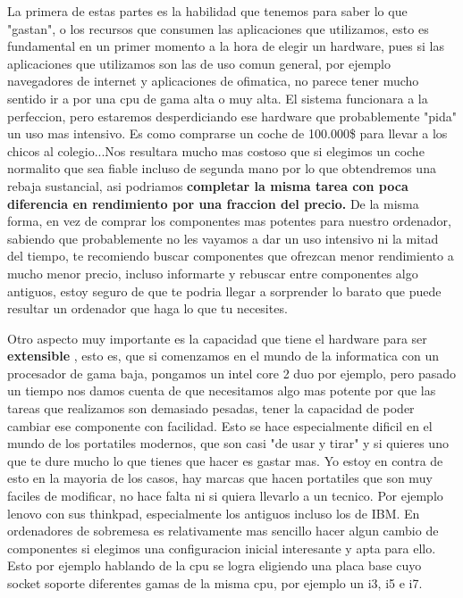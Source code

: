 La primera de estas partes es la habilidad que tenemos para saber lo que "gastan", o los recursos que consumen las aplicaciones que utilizamos, esto es fundamental en un primer momento a la hora de elegir un hardware, pues si las aplicaciones que utilizamos son las de uso comun general, por ejemplo navegadores de internet y aplicaciones de ofimatica, no parece tener mucho sentido ir a por una cpu de gama alta o muy alta. El sistema funcionara a la perfeccion, pero estaremos desperdiciando ese hardware que probablemente "pida" un uso mas intensivo. Es como comprarse un coche de 100.000\$ para llevar a los chicos al colegio...Nos resultara mucho mas costoso que si elegimos un coche normalito que sea fiable incluso de segunda mano por lo que obtendremos una rebaja sustancial, asi podriamos \textbf{ completar la misma tarea con poca diferencia en rendimiento por una fraccion del precio. } De la misma forma, en vez de comprar los componentes mas potentes para nuestro ordenador, sabiendo que probablemente no les vayamos a dar un uso intensivo ni la mitad del tiempo, te recomiendo buscar componentes que ofrezcan menor rendimiento a mucho menor precio, incluso informarte y rebuscar entre componentes algo antiguos, estoy seguro de que te podria llegar a sorprender lo barato que puede resultar un ordenador que haga lo que tu necesites.

Otro aspecto muy importante es la capacidad que tiene el hardware para ser \textbf{ extensible }, esto es, que si comenzamos en el mundo de la informatica con un procesador de gama baja, pongamos un intel core 2 duo por ejemplo, pero pasado un tiempo nos damos cuenta de que necesitamos algo mas potente por que las tareas que realizamos son demasiado pesadas, tener la capacidad de poder cambiar ese componente con facilidad. Esto se hace especialmente dificil en el mundo de los portatiles modernos, que son casi "de usar y tirar" y si quieres uno que te dure mucho lo que tienes que hacer es gastar mas. Yo estoy en contra de esto en la mayoria de los casos, hay marcas que hacen portatiles que son muy faciles de modificar, no hace falta ni si quiera llevarlo a un tecnico. Por ejemplo lenovo con sus thinkpad, especialmente los antiguos incluso los de IBM. En ordenadores de sobremesa es relativamente mas sencillo hacer algun cambio de componentes si elegimos una configuracion inicial interesante y apta para ello. Esto por ejemplo hablando de la cpu se logra eligiendo una placa base cuyo socket soporte diferentes gamas de la misma cpu, por ejemplo un i3, i5 e i7. 

